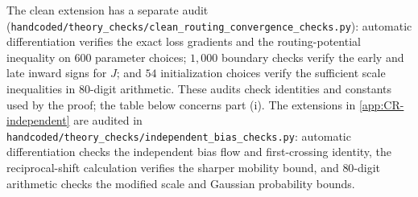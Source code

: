 The clean extension has a separate audit (\nolinkurl{handcoded/theory_checks/clean_routing_convergence_checks.py}):
automatic differentiation verifies the exact loss gradients and the routing-potential inequality on $600$ parameter choices;
$1{,}000$ boundary checks verify the early and late inward signs for $J$; and $54$ initialization choices verify the sufficient
scale inequalities in $80$-digit arithmetic. These audits check identities and constants used by the proof; the table below concerns part (i).
The extensions in \cref{app:CR-independent} are audited in
\nolinkurl{handcoded/theory_checks/independent_bias_checks.py}: automatic differentiation checks the independent bias flow
and first-crossing identity, the reciprocal-shift calculation verifies the sharper mobility bound, and $80$-digit arithmetic
checks the modified scale and Gaussian probability bounds.

